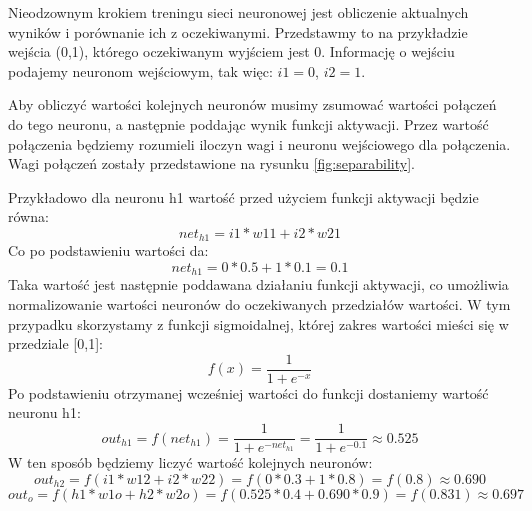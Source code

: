 Nieodzownym krokiem treningu sieci neuronowej jest obliczenie aktualnych wyników i porównanie ich z oczekiwanymi.
Przedstawmy to na przykładzie wejścia (0,1), którego oczekiwanym wyjściem jest 0.
Informację o wejściu podajemy neuronom wejściowym, tak więc: \(i1=0\), \(i2=1\).

Aby obliczyć wartości kolejnych neuronów musimy zsumować wartości połączeń do tego neuronu, a następnie poddając wynik funkcji aktywacji.
Przez wartość połączenia będziemy rozumieli iloczyn wagi i neuronu wejściowego dla połączenia.
Wagi połączeń zostały przedstawione na rysunku \ref{fig:separability}.

Przykładowo dla neuronu h1 wartość przed użyciem funkcji aktywacji będzie równa:
\[
  net_{h1}  = i1*w11+i2*w21
\]
Co po podstawieniu wartości da:
\[
  net_{h1} = 0*0.5+1*0.1=0.1
\]
Taka wartość jest następnie poddawana działaniu funkcji aktywacji, 
co umożliwia normalizowanie wartości neuronów do oczekiwanych przedziałów wartości.
W tym przypadku skorzystamy z funkcji sigmoidalnej, której zakres wartości mieści się w przedziale [0,1]:
\[
    f(x) =  \frac{1}{1 + e^{-x} } 
\]
Po podstawieniu otrzymanej wcześniej wartości do funkcji dostaniemy wartość neuronu h1:
\[
    out_{h1} 
    = f(net_{h1}) 
    =  \frac{1 }{1 + e^{-net_{h1}} } 
    =  \frac{1 }{1 + e^{-0.1} } \approx 0.525
\]
W ten sposób będziemy liczyć wartość kolejnych neuronów:
\[
    out_{h2}=f(i1*w12+i2*w22)=f(0*0.3+1*0.8)=f(0.8) \approx 0.690
\]
\[
    out_{o}=f(h1*w1o+h2*w2o)=f(0.525*0.4+0.690*0.9)=f(0.831) \approx 0.697
\]
